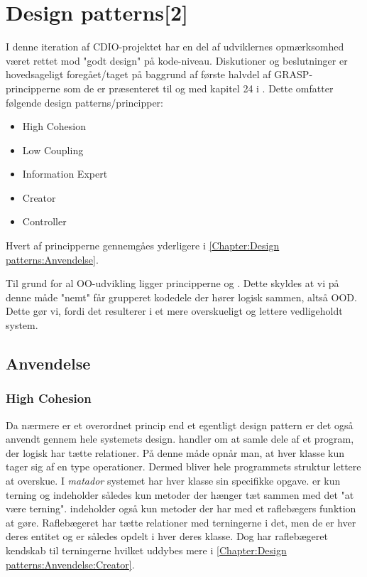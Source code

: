 \chapter{Design patterns[2]}\label{Chapter:Design patterns}
I denne iteration af CDIO-projektet \cite{CDIOdel2} har en del af udviklernes opmærksomhed været rettet mod "godt design" på kode-niveau. Diskutioner og beslutninger er hovedsageligt foregået/taget på baggrund af første halvdel af GRASP-principperne som de er præsenteret til og med kapitel 24 i \cite{umlbook}. Dette omfatter følgende design patterns/principper: 

\begin{itemize}
	\item High Cohesion    
	\item Low Coupling
	\item Information Expert
	\item Creator
	\item Controller
\end{itemize}





Hvert af principperne gennemgåes yderligere i \vref{Chapter:Design patterns:Anvendelse}.

Til grund for al OO-udvikling ligger principperne  og . Dette skyldes at vi på denne måde "nemt" får grupperet kodedele der hører logisk sammen, altså OOD. Dette gør vi, fordi det resulterer i et mere overskueligt og lettere vedligeholdt system.
 
\section{Anvendelse}\label{Chapter:Design patterns:Anvendelse}

\subsection{High Cohesion}\label{Chapter:Design patterns:Anvendelse:High Cohesion}
Da  nærmere er et overordnet princip end et egentligt design pattern er det også anvendt gennem hele systemets design.  handler om at samle dele af et program, der logisk har tætte relationer. På denne måde opnår man, at hver klasse kun tager sig af en type operationer. Dermed bliver hele programmets struktur lettere at overskue. I \textit{matador} systemet har hver klasse sin specifikke opgave.  er kun terning og indeholder således kun metoder der hænger tæt sammen med det "at være terning".  indeholder også kun metoder der har med et raflebægers funktion at gøre. Raflebægeret har tætte relationer med terningerne i det, men de er hver deres entitet og er således opdelt i hver deres klasse. Dog har raflebægeret kendskab til terningerne hvilket uddybes mere i \vref{Chapter:Design patterns:Anvendelse:Creator}.       

